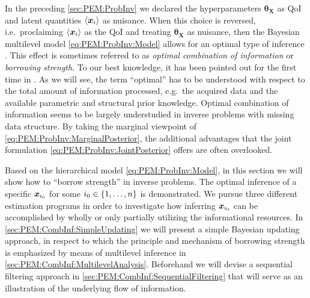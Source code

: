 In the preceding \cref{sec:PEM:ProbInv} we declared the hyperparameters \(\bm{\theta}_{\bm{X}}\) as QoI and latent quantities \(\langle{\bm{x}_i}\rangle\) as nuisance.
When this choice is reversed, i.e.\ proclaiming \(\langle{\bm{x}_i}\rangle\) as the QoI and treating \(\bm{\theta}_{\bm{X}}\) as nuisance,
then the Bayesian multilevel model \cref{eq:PEM:ProbInv:Model} allows for an optimal type of inference \cite{Nagel:ICVRAM2014:Proc}.
This effect is sometimes referred to as \textit{optimal combination of information} or \textit{borrowing strength}.
To our best knowledge, it has been pointed out for the first time in \cite{Multilevel:Draper1992}.
As we will see, the term ``optimal'' has to be understood with respect to the total amount of information processed, e.g.\ the acquired data and the available parametric and structural prior knowledge.
Optimal combination of information seems to be largely understudied in inverse problems with missing data structure.
By taking the marginal viewpoint of \cref{eq:PEM:ProbInv:MarginalPosterior}, the additional advantages that the joint formulation \cref{eq:PEM:ProbInv:JointPosterior} offers are often overlooked.
\par %
Based on the hierarchical model \cref{eq:PEM:ProbInv:Model}, in this section we will show how to ``borrow strength'' in inverse problems.
The optimal inference of a specific \(\bm{x}_{i_0}\) for some \(i_0 \in \{1,\ldots,n\}\) is demonstrated.
We pursue three different estimation programs in order to investigate how inferring \(\bm{x}_{i_0}\) can be accomplished by wholly or only partially utilizing the informational resources.
In \cref{sec:PEM:CombInf:SimpleUpdating} we will present a simple Bayesian updating approach,
in respect to which the principle and mechanism of borrowing strength is emphasized by means of multilevel inference in \cref{sec:PEM:CombInf:MultilevelAnalysis}.
Beforehand we will devise a sequential filtering approach in \cref{sec:PEM:CombInf:SequentialFiltering} that will serve as an illustration of the underlying flow of information.

